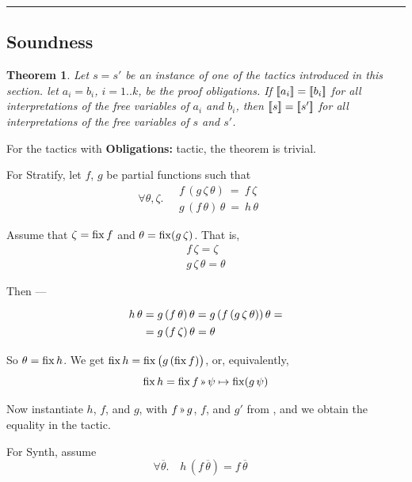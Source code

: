 \hrule
\bigskip


\subsection{Soundness}

\newtheorem{theorem}{Theorem}
\renewenvironment{proof}{\noindent{\bf Proof.~}}{}

\begin{theorem}
Let $s=s'$ be an instance of one of the tactics introduced in this section.
let $a_i=b_i$, $i=1..k$, be the proof obligations. If $[\![{a_i}]\!]=[\![{b_i}]\!]$
for all interpretations of the free variables of $a_i$ and $b_i$, then
$[\![{s}]\!]=[\![{s'}]\!]$ for all interpretations of the free variables of $s$ and $s'$.
\end{theorem}

\begin{proof}
For the tactics with {\bf Obligations:} tactic, the theorem is trivial.

\medskip
For Stratify, let $f$, $g$ be partial functions such that
\[\renewcommand\arraystretch{1.3}
  \forall \theta,\zeta.\quad \begin{array}{l}f\,(g\,\zeta\,\theta) ~=~ f\,\zeta \\
  g\,(f\,\theta)\,\theta ~=~ h\,\theta
  \end{array}\quad\]
  
Assume that $\zeta = \operatorname{fix} f$ and $\theta = \operatorname{fix} (g\,\zeta)$. That is,
\[\renewcommand\arraystretch{1.3}
  \begin{array}{l}
    f\,\zeta = \zeta\\
    g\,\zeta\,\theta = \theta
  \end{array}\]
  
Then ---
\[\renewcommand\arraystretch{1.3}
  \begin{array}{l@{}l}
   h\,\theta & {}= g\,(f\,\theta)\,\theta = g\,(f\,(g\,\zeta\,\theta))\,\theta = \\
             & {}= g\,(f\,\zeta)\,\theta = \theta
  \end{array}\]
  
So $\theta = \operatorname{fix} h$. We get $\operatorname{fix} h = \operatorname{fix} \big(g \,(\operatorname{fix} f)\big)$, or, equivalently,
\[\fix h = \fix f \applt \psi\mapsto\fix (g\,\psi)\]

Now instantiate $h$, $f$, and $g$, with $f\applt g$, $f$, and $g'$ from ,
and we obtain the equality in the tactic.

\medskip
For Synth, assume
\[\renewcommand\arraystretch{1.3}
  \forall \overline\theta.\quad h\,(f\,\overline\theta)=f\,\overline\theta \quad\]


\end{proof}
